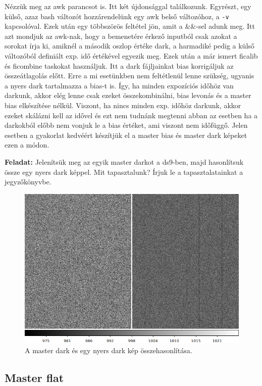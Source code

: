\documentclass{article}
\begin{document}
Nézzük meg az awk parancsot is. Itt két újdonsággal találkozunk. Egyrészt, egy
külső, azaz bash változót hozzárendelünk egy awk belső változóhoz, a \verb+-v+
kapcsolóval. Ezek után egy többszörös feltétel jön, amit a \&\&-sel adunk meg.
Itt azt mondjuk az awk-nak, hogy a bemenetére érkező inputból csak azokat a
sorokat írja ki, amiknél a második oszlop értéke dark, a harmadiké pedig a külső
változóból definiált exp. idő értékével egyezik meg.
Ezek után a már ismert ficalib és ficombine taskokat használjuk. Itt a dark
fájljainkat bias korrigáljuk az összeátlagolás előtt. Erre a mi esetünkben nem
feltétlenül lenne szükség, ugyanis a nyers dark tartalmazza a bias-t is. Így, ha
minden expozíciós időhöz van darkunk, akkor elég lenne csak ezeket
összekombinálni, bias levonás és a master bias elkészítése nélkül. Viszont, ha
nincs minden exp. időhöz darkunk, akkor ezeket skálázni kell az idővel és ezt
nem tudnánk megtenni abban az esetben ha a darkokból előbb nem vonjuk le a bias
értéket, ami viszont nem időfüggő. Jelen esetben a gyakorlat kedvéért készítjük
el a master bias és master dark képeket ezen a módon.

{\bf Feladat:}
Jelenítsük meg az egyik master darkot a ds9-ben, majd hasonlítsuk össze egy
nyers dark képpel. Mit tapasztalunk? Írjuk le a tapasztalatainkat a
jegyzőkönyvbe.

\begin{figure}
    \centering
    \includegraphics[width=0.8\linewidth]{pics/darkcomp.png}
    \caption{A master dark és egy nyers dark kép összehasonlítása.}
    \label{darkcomp}
\end{figure}

\subsection{Master flat}
\end{document}
